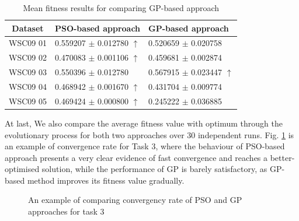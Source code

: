 \documentclass{llncs}
\begin{document}
\begin{table}[]
\centering
\caption{Mean fitness results for comparing GP-based approach}
\label{meanFitness}
\begin{tabular}{l|l|l}
\hline
\multicolumn{1}{c|}{Dataset} & PSO-based approach & GP-based approach  \\ \hline
WSC09 01                     &0.559207 $\pm$ 0.012780  $\uparrow$   &0.520659 $\pm$ 0.020758           \\ \hline
WSC09 02                     &0.470083 $\pm$  0.001106 $\uparrow$   &0.459681 $\pm$  0.002874          \\ \hline
WSC09 03                     & 0.550396 $\pm$ 0.012780                        &0.567915 $\pm$ 0.023447 $\uparrow$   \\ \hline
WSC09 04                     & 0.468942 $\pm$ 0.001670  $\uparrow$   &0.431704 $\pm$ 0.009774            \\ \hline
WSC09 05                     & 0.469424 $\pm$ 0.000800  $\uparrow$   &0.245222 $\pm$ 0.036885            \\ \hline
\end{tabular}
\end{table}

At last, We also compare the average fitness value with optimum through the evolutionary process for both two approaches over 30 independent runs. Fig. \ref{psovsgp} is an example of convergence rate for Task 3, where the behaviour of PSO-based approach presents a very clear evidence of fast convergence and reaches a better-optimised solution, while the performance of GP is barely satisfactory, as GP-based method improves its fitness value gradually.


\begin{figure}[h]
\centering
{}
 \caption{An example of comparing convergency rate of PSO and GP approaches for task 3}
 \label{psovsgp}
\end{figure}
\end{document}
